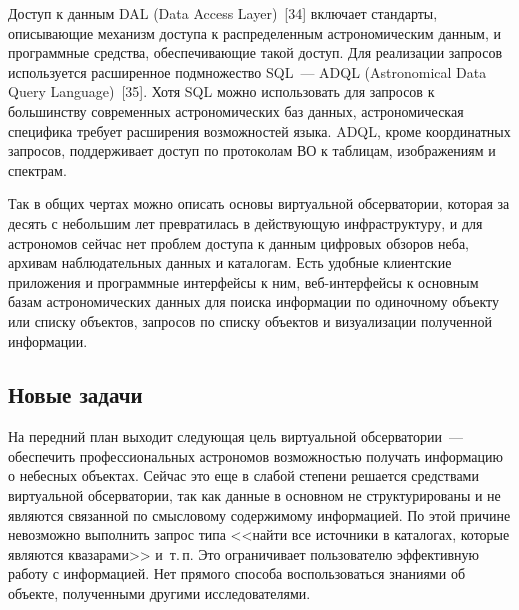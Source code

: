 \begin{multicols}{2}
      Доступ к данным DAL ({Data Access Layer})~[34] включает стандарты, 
описывающие механизм доступа к распределенным астрономическим данным, и 
программные средства, обеспечивающие такой доступ. Для реализации запросов 
используется расширенное подмножество SQL~--- ADQL ({Astronomical Data 
Query Language})~[35]. Хотя SQL можно использовать для запросов к большинству 
современных астрономических баз данных, астрономическая специфика требует расширения 
возможностей языка. ADQL, кроме координатных запросов, поддерживает доступ по 
протоколам ВО к таблицам, изображениям и спектрам. 
      
      Так в общих чертах можно описать основы виртуальной обсерватории, которая за 
десять с небольшим лет превратилась в действующую инфраструктуру, и для астрономов 
сейчас нет проблем доступа к данным цифровых обзоров неба, архивам наблюдательных 
данных и каталогам. Есть удобные клиентские приложения и программные интерфейсы к 
ним, веб-интерфейсы к основным базам астрономических данных для поиска информации по 
одиночному объекту или списку объектов, запросов по списку объектов и визуализации 
полученной информации. 

\vspace*{-4pt}
  
\subsection{Новые задачи}

\vspace*{-1pt}

      На передний план выходит следующая цель виртуальной обсерватории~--- обеспечить 
профессиональных астрономов возможностью получать информацию о небесных объектах. 
Сейчас это еще в слабой степени решается средствами виртуальной обсерватории, так как 
данные в основном не структурированы и не являются связанной по смысловому 
содержимому информацией. По этой причине невозможно выполнить запрос типа <<найти 
все источники в каталогах, которые являются квазарами>> и~т.\,п. Это ограничивает 
пользователю эффективную работу с информацией. Нет прямого способа воспользоваться 
знаниями об объекте, полученными другими исследователями. 
      

\end{multicols}
